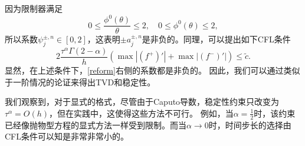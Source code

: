 因为限制器满足
\[
0 \le \frac{\phi^0 (\theta)}{\theta} \le 2,\quad 0 \le \phi^0(\theta) \le 2,
\]
所以系数$\psi_j^{\pm,n} \in [0,2]$，这表明$\pm a^{\pm,n}_j$是非负的。同理，可以提出如下CFL条件
\begin{equation}\label{CFL2}
 2 \frac{ \tau^\alpha \Gamma (2-\alpha)}  {h} \left( \max |(f^+)'|+\max|(f^-)'| \right)  \le \tilde c.
\end{equation}
显然，在上述条件下，\eqref{reform}右侧的系数都是非负的。 因此，我们可以通过类似于一阶情况的论证来得出TVD和稳定性。

我们观察到，对于显式的格式，尽管由于Caputo导数，稳定性约束只改变为$\tau^\alpha = O(h)$，但在实践中，这使得这些方法不可行。 例如，当$\alpha = \frac{1}{2}$时，该约束已经像抛物型方程的显式方法一样受到限制。而当$ \alpha \rightarrow 0 $时，时间步长的选择由CFL条件可以知是非常非常小的。
%
